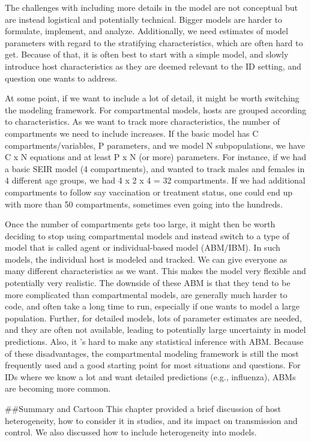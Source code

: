\documentclass[]{book}
\theoremstyle{definition}
\theoremstyle{definition}
\theoremstyle{definition}
\theoremstyle{remark}
\begin{document}
The challenges with including more details in the model are not
conceptual but are instead logistical and potentially technical. Bigger
models are harder to formulate, implement, and analyze. Additionally, we
need estimates of model parameters with regard to the stratifying
characteristics, which are often hard to get. Because of that, it is
often best to start with a simple model, and slowly introduce host
characteristics as they are deemed relevant to the ID setting, and
question one wants to address.

At some point, if we want to include a lot of detail, it might be worth
switching the modeling framework. For compartmental models, hosts are
grouped according to characteristics. As we want to track more
characteristics, the number of compartments we need to include
increases. If the basic model has C compartments/variables, P
parameters, and we model N subpopulations, we have C x N equations and
at least P x N (or more) parameters. For instance, if we had a basic
SEIR model (4 compartments), and wanted to track males and females in 4
different age groups, we had 4 x 2 x 4 = 32 compartments. If we had
additional compartments to follow say vaccination or treatment status,
one could end up with more than 50 compartments, sometimes even going
into the hundreds.

Once the number of compartments gets too large, it might then be worth
deciding to stop using compartmental models and instead switch to a type
of model that is called agent or individual-based model (ABM/IBM). In
such models, the individual host is modeled and tracked. We can give
everyone as many different characteristics as we want. This makes the
model very flexible and potentially very realistic. The downside of
these ABM is that they tend to be more complicated than compartmental
models, are generally much harder to code, and often take a long time to
run, especially if one wants to model a large population. Further, for
detailed models, lots of parameter estimates are needed, and they are
often not available, leading to potentially large uncertainty in model
predictions. Also, it 's hard to make any statistical inference with
ABM. Because of these disadvantages, the compartmental modeling
framework is still the most frequently used and a good starting point
for most situations and questions. For IDs where we know a lot and want
detailed predictions (e.g., influenza), ABMs are becoming more common.

\#\#Summary and Cartoon This chapter provided a brief discussion of host
heterogeneity, how to consider it in studies, and its impact on
transmission and control. We also discussed how to include heterogeneity
into models.
\end{document}

